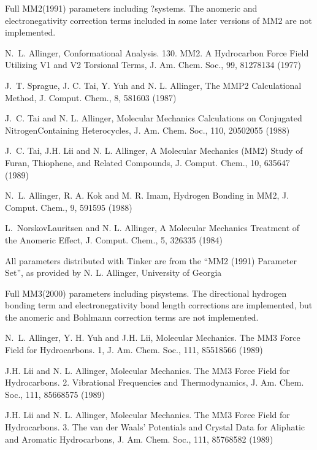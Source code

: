 \documentclass[letterpaper,11pt,english]{sphinxmanual}
\begin{document}
Full MM2(1991) parameters including ?\sphinxhyphen{}systems. The anomeric and electronegativity correction terms included in some later versions of MM2 are not implemented.

N. L. Allinger, Conformational Analysis. 130. MM2. A Hydrocarbon Force Field Utilizing V1 and V2 Torsional Terms, J. Am. Chem. Soc., 99, 8127\sphinxhyphen{}8134 (1977)

J. T. Sprague, J. C. Tai, Y. Yuh and N. L. Allinger, The MMP2 Calculational Method, J. Comput. Chem., 8, 581\sphinxhyphen{}603 (1987)

J. C. Tai and N. L. Allinger, Molecular Mechanics Calculations on Conjugated Nitrogen\sphinxhyphen{}Containing Heterocycles, J. Am. Chem. Soc., 110, 2050\sphinxhyphen{}2055 (1988)

J. C. Tai, J.\sphinxhyphen{}H. Lii and N. L. Allinger, A Molecular Mechanics (MM2) Study of Furan, Thiophene, and Related Compounds, J. Comput. Chem., 10, 635\sphinxhyphen{}647 (1989)

N. L. Allinger, R. A. Kok and M. R. Imam, Hydrogen Bonding in MM2, J. Comput. Chem., 9, 591\sphinxhyphen{}595 (1988)

L. Norskov\sphinxhyphen{}Lauritsen and N. L. Allinger, A Molecular Mechanics Treatment of the Anomeric Effect, J. Comput. Chem., 5, 326\sphinxhyphen{}335 (1984)

All parameters distributed with Tinker are from the “MM2 (1991) Parameter Set”, as provided by N. L. Allinger, University of Georgia


Full MM3(2000) parameters including pi\sphinxhyphen{}systems. The directional hydrogen bonding term and electronegativity bond length corrections are implemented, but the anomeric and Bohlmann correction terms are not implemented.

N. L. Allinger, Y. H. Yuh and J.\sphinxhyphen{}H. Lii, Molecular Mechanics. The MM3 Force Field for Hydrocarbons. 1, J. Am. Chem. Soc., 111, 8551\sphinxhyphen{}8566 (1989)

J.\sphinxhyphen{}H. Lii and N. L. Allinger, Molecular Mechanics. The MM3 Force Field for Hydrocarbons. 2. Vibrational Frequencies and Thermodynamics, J. Am. Chem. Soc., 111, 8566\sphinxhyphen{}8575 (1989)

J.\sphinxhyphen{}H. Lii and N. L. Allinger, Molecular Mechanics. The MM3 Force Field for Hydrocarbons. 3. The van der Waals’ Potentials and Crystal Data for Aliphatic and Aromatic Hydrocarbons, J. Am. Chem. Soc., 111, 8576\sphinxhyphen{}8582 (1989)
\end{document}
